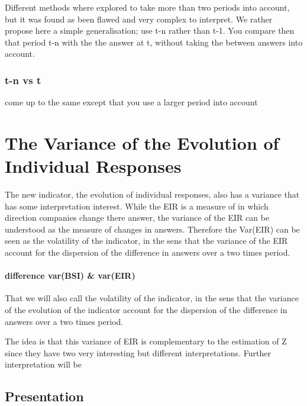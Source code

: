 \documentclass[12pt,a4paper,oneside]{book}
\begin{document}
Different methods where explored to take more than two periods into account, but it was found as been flawed and very complex to interpret.
We rather propose here a simple generalisation; use t-n rather than t-1. You compare then that period t-n with the the answer at t, without taking the between answers into account.

\subsection{t-n vs t}

come up to the same except that you use a larger period into account


\chapter{The Variance of the Evolution of Individual Responses} \label{Chapter:Var Z}

The new indicator, the evolution of individual responses, also has a variance that has some interpretation interest. 
While the EIR is a measure of in which direction companies change there answer, the variance of the EIR can be understood as the measure of changes in answers. Therefore the Var(EIR) can be seen as the volatility of the indicator, in the sens that the variance of the EIR account for the dispersion of the difference in answers over a two times period.

\subsubsection{difference var(BSI) \& var(EIR)}

That we will also call the volatility of the indicator, in the sens that the variance of the evolution of the indicator account for the dispersion of the difference in answers over a two times period.


The idea is that this variance of EIR is complementary to the estimation of Z since they have two very interesting but different interpretations.
Further interpretation will be 

\section{Presentation}
\end{document}
